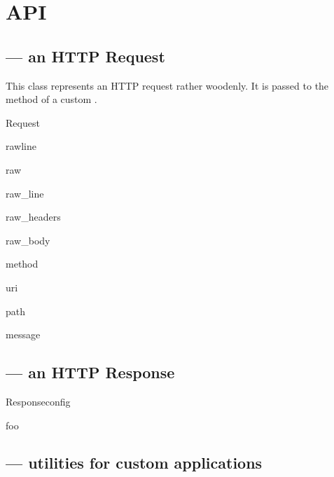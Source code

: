 \chapter{API}

\section{ --- an HTTP Request}

This class represents an HTTP request rather woodenly. It is passed to the
 method of a custom .

\begin{classdesc}{Request}

rawline

raw

raw_line

raw_headers

raw_body

method

uri

path

message



\end{classdesc}



\section{ --- an HTTP Response}

\begin{classdesc}{Response}{config}

foo
\end{classdesc}


\section{ --- utilities for custom applications}

